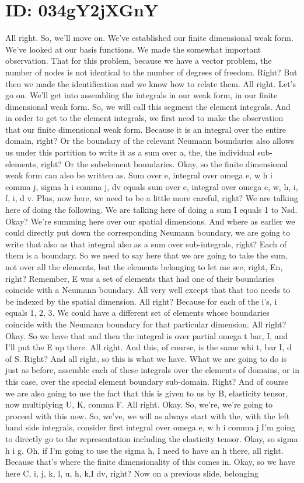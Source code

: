 \documentclass[10pt]{article}
\begin{document}
\section*{ID: 034gY2jXGnY}
All right. So, we'll move on. We've established our finite dimensional weak form. We've looked at our basis functions. We made the somewhat important observation. That for this problem, because we have a vector problem, the number of nodes is not identical to the number of degrees of freedom. Right? But then we made the identification and we know how to relate them. All right. Let's go on. We'll get into assembling the integrals in our weak form, in our finite dimensional weak form. So, we will call this segment the element integrals. And in order to get to the element integrals, we first need to make the observation that our finite dimensional weak form. Because it is an integral over the entire domain, right? Or the boundary of the relevant Neumann boundaries also allows us under this partition to write it as a sum over a, the, the individual sub-elements, right? Or the subelement boundaries. Okay, so the finite dimensional weak form can also be written as. Sum over e, integral over omega e, w h i comma j, sigma h i comma j, dv equals sum over e, integral over omega e, w, h, i, f, i, d v. Plus, now here, we need to be a little more careful, right? We are talking here of doing the following. We are talking here of doing a sum I equals 1 to Nsd. Okay? We're summing here over our spatial dimensions. And where as earlier we could directly put down the corresponding Neumann boundary, we are going to write that also as that integral also as a sum over sub-integrals, right? Each of them is a boundary. So we need to say here that we are going to take the sum, not over all the elements, but the elements belonging to let me see, right, En, right? Remember, E was a set of elements that had one of their boundaries coincide with a Neumann boundary. All very well except that that too needs to be indexed by the spatial dimension. All right? Because for each of the i's, i equals 1, 2, 3. We could have a different set of elements whose boundaries coincide with the Neumann boundary for that particular dimension. All right? Okay. So we have that and then the integral is over partial omega t bar, I, and I'll put the E up there. All right. And this, of course, is the same whi t, bar I, d of S. Right? And all right, so this is what we have. What we are going to do is just as before, assemble each of these integrals over the elements of domains, or in this case, over the special element boundary sub-domain. Right? And of course we are also going to use the fact that this is given to us by B, elasticity tensor, now multiplying U, K, comma F. All right. Okay. So, we're, we're going to proceed with this now. So, we've, we will as always start with the, with the left hand side integrals, consider first integral over omega e, w h i comma j I'm going to directly go to the representation including the elasticity tensor. Okay, so sigma h i g. Oh, if I'm going to use the sigma h, I need to have an h there, all right. Because that's where the finite dimensionality of this comes in. Okay, so we have here C, i, j, k, l, u, h, k,I dv, right? Now on a previous slide, belonging 
\end{document}
